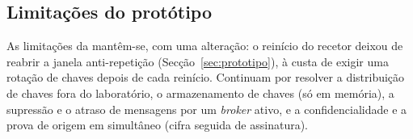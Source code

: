 \subsection{Limitações do protótipo}

As limitações da  mantêm-se, com uma alteração: o reinício do
recetor deixou de reabrir a janela anti-repetição (Secção~\ref{sec:prototipo}), à
custa de exigir uma rotação de chaves depois de cada reinício. Continuam por
resolver a distribuição de chaves fora do laboratório, o armazenamento de chaves
(só em memória), a supressão e o atraso de mensagens por um \emph{broker} ativo, e
a confidencialidade e a prova de origem em simultâneo (cifra seguida de
assinatura).
